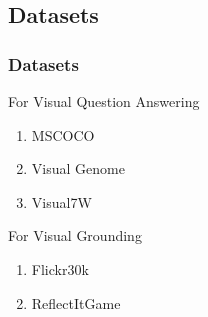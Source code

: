 \documentclass{beamer}
\begin{document}
\subsection{Datasets}
\begin{frame}
\frametitle{Datasets}
For Visual Question Answering
\begin{enumerate} 
  \item MSCOCO
  \item Visual Genome
  \item Visual7W
  \end{enumerate}  
  
   \vspace{0.5cm}

  
For Visual Grounding
  \begin{enumerate} 
  \item Flickr30k
  \item ReflectItGame
  \end{enumerate} 
\end{frame}
\end{document}
